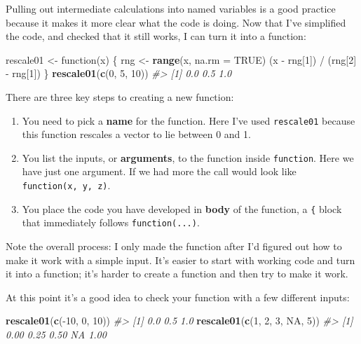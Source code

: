\documentclass[]{book}
\newenvironment{Shaded}{\begin{snugshade}}{\end{snugshade}}
\newcommand{\KeywordTok}[1]{\textcolor[rgb]{0.13,0.29,0.53}{\textbf{{#1}}}}
\newcommand{\DataTypeTok}[1]{\textcolor[rgb]{0.13,0.29,0.53}{{#1}}}
\newcommand{\DecValTok}[1]{\textcolor[rgb]{0.00,0.00,0.81}{{#1}}}
\newcommand{\StringTok}[1]{\textcolor[rgb]{0.31,0.60,0.02}{{#1}}}
\newcommand{\CommentTok}[1]{\textcolor[rgb]{0.56,0.35,0.01}{\textit{{#1}}}}
\newcommand{\OtherTok}[1]{\textcolor[rgb]{0.56,0.35,0.01}{{#1}}}
\newcommand{\NormalTok}[1]{{#1}}
\begin{document}
Pulling out intermediate calculations into named variables is a good
practice because it makes it more clear what the code is doing. Now that
I've simplified the code, and checked that it still works, I can turn it
into a function:

\begin{Shaded}
\begin{Highlighting}[]
\NormalTok{rescale01 <-}\StringTok{ }\NormalTok{function(x) \{}
  \NormalTok{rng <-}\StringTok{ }\KeywordTok{range}\NormalTok{(x, }\DataTypeTok{na.rm =} \OtherTok{TRUE}\NormalTok{)}
  \NormalTok{(x -}\StringTok{ }\NormalTok{rng[}\DecValTok{1}\NormalTok{]) /}\StringTok{ }\NormalTok{(rng[}\DecValTok{2}\NormalTok{] -}\StringTok{ }\NormalTok{rng[}\DecValTok{1}\NormalTok{])}
\NormalTok{\}}
\KeywordTok{rescale01}\NormalTok{(}\KeywordTok{c}\NormalTok{(}\DecValTok{0}\NormalTok{, }\DecValTok{5}\NormalTok{, }\DecValTok{10}\NormalTok{))}
\CommentTok{#> [1] 0.0 0.5 1.0}
\end{Highlighting}
\end{Shaded}

There are three key steps to creating a new function:

\begin{enumerate}
\def\labelenumi{\arabic{enumi}.}
\item
  You need to pick a \textbf{name} for the function. Here I've used
  \texttt{rescale01} because this function rescales a vector to lie
  between 0 and 1.
\item
  You list the inputs, or \textbf{arguments}, to the function inside
  \texttt{function}. Here we have just one argument. If we had more the
  call would look like \texttt{function(x,\ y,\ z)}.
\item
  You place the code you have developed in \textbf{body} of the
  function, a \texttt{\{} block that immediately follows
  \texttt{function(...)}.
\end{enumerate}

Note the overall process: I only made the function after I'd figured out
how to make it work with a simple input. It's easier to start with
working code and turn it into a function; it's harder to create a
function and then try to make it work.

At this point it's a good idea to check your function with a few
different inputs:

\begin{Shaded}
\begin{Highlighting}[]
\KeywordTok{rescale01}\NormalTok{(}\KeywordTok{c}\NormalTok{(-}\DecValTok{10}\NormalTok{, }\DecValTok{0}\NormalTok{, }\DecValTok{10}\NormalTok{))}
\CommentTok{#> [1] 0.0 0.5 1.0}
\KeywordTok{rescale01}\NormalTok{(}\KeywordTok{c}\NormalTok{(}\DecValTok{1}\NormalTok{, }\DecValTok{2}\NormalTok{, }\DecValTok{3}\NormalTok{, }\OtherTok{NA}\NormalTok{, }\DecValTok{5}\NormalTok{))}
\CommentTok{#> [1] 0.00 0.25 0.50   NA 1.00}
\end{Highlighting}
\end{Shaded}
\end{document}
